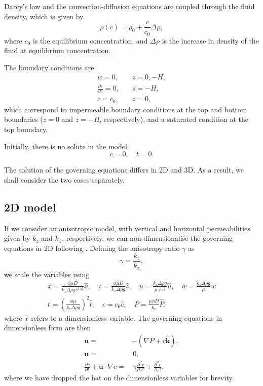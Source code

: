 \documentclass[11pt, a4paper]{csiroreport2012}
\begin{document}
Darcy's law and the convection-diffusion equations are coupled through the fluid density, which is given by
\begin{equation}
\rho(c) = \rho_0 + \frac{c}{c_0} \Delta \rho,
\label{eq:density}
\end{equation}
where $c_0$ is the equilibrium concentration, and $\Delta \rho$ is the increase in density of the fluid at equilibrium concentration.

The boundary conditions are
\begin{align}
w = 0,&  \quad z = 0, -H, \\
\frac{\partial c}{\partial z} = 0,& \quad z = -H, \\
c = c_0,& \quad z = 0,
\end{align}
which correspond to impermeable boundary conditions at the top and bottom boundaries ($z = 0$ and $z=-H$, respectively), and a saturated condition at the top boundary.

Initially, there is no solute in the model
\begin{equation}
c = 0, \quad t = 0.
\end{equation}

The solution of the governing equations differs in 2D and 3D. As a result, we shall consider the two cases separately.

\subsection{2D model}

If we consider an anisotropic model, with vertical and horizontal permeabilities given by $k_z$ and $k_x$, respectively, we can non-dimensionalise the governing equations in 2D following \cite{EnnisKing2005}. Defining the anisotropy ratio $\gamma$ as
\begin{equation}
\gamma = \frac{k_z}{k_x},
\label{eq:gamma}
\end{equation}
we scale the variables using
\begin{align}
x = \frac{\phi \mu D}{k_z \Delta \rho g \gamma^{1/2}} \hat{x}, \quad z =  \frac{\phi \mu D}{k_z \Delta \rho g} \hat{z}, \quad u = \frac{k_z \Delta \rho g}{\mu \gamma^{1/2}} \hat{u}, \quad w = \frac{k_z \Delta \rho g}{\mu} \hat{w} \nonumber \\
t = \left(\frac{\phi \mu}{k_z \Delta \rho g}\right)^2 \hat{t}, \quad c = c_0 \hat{c}, \quad P = \frac{\mu \phi D}{k_z}\hat{P}, \qquad \qquad \qquad
\label{eq:scales}
\end{align}
where $\hat{x}$ refers to a dimensionless variable. The governing equations in dimensionless form are then
\begin{align}
\mathbf{u} = & - \left(\nabla P + c \mathbf{\hat{k}}\right), \label{eq:darcydim}\\
\mathbf{u} = & \,0, \label{eq:ctydim} \\
\frac{\partial c}{\partial t} + \mathbf{u} \cdot \nabla c = &\,  \gamma \frac{\partial^2 c}{\partial x^2} + \frac{\partial^2 c}{\partial z^2}, \label{eq:condiffdim}
\end{align}
where we have dropped the hat on the dimensionless variables for brevity.
\end{document}
